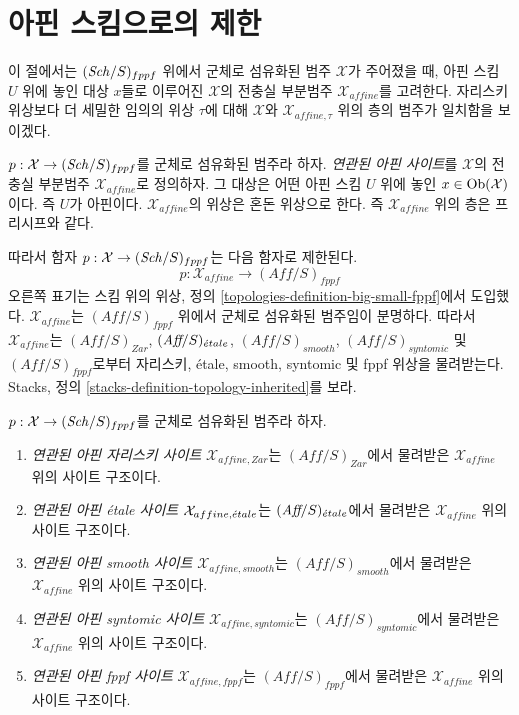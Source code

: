 \section{아핀 스킴으로의 제한}
\label{section-alternative}

\noindent
이 절에서는 $(\mathit{Sch}/S)_{fppf}$ 위에서 군체로 섬유화된 범주
$\mathcal{X}$가 주어졌을 때, 아핀 스킴 $U$ 위에 놓인 대상 $x$들로
이루어진 $\mathcal{X}$의 전충실 부분범주 $\mathcal{X}_{affine}$를
고려한다. 자리스키 위상보다 더 세밀한 임의의 위상 $\tau$에 대해
$\mathcal{X}$와 $\mathcal{X}_{affine, \tau}$ 위의 층의 범주가
일치함을 보이겠다.

\begin{definition}
\label{definition-alternative}
$p : \mathcal{X} \to (\mathit{Sch}/S)_{fppf}$를 군체로 섬유화된 범주라 하자.
{\it 연관된 아핀 사이트}를 $\mathcal{X}$의 전충실 부분범주
$\mathcal{X}_{affine}$로 정의하자. 그 대상은 어떤 아핀 스킴 $U$ 위에
놓인 $x \in \mathop{\mathrm{Ob}}\nolimits(\mathcal{X})$이다. 즉 $U$가 아핀이다.
$\mathcal{X}_{affine}$의 위상은
혼돈 위상으로 한다. 즉 $\mathcal{X}_{affine}$ 위의 층은 프리시프와 같다.
\end{definition}

\noindent
따라서 함자 $p : \mathcal{X} \to (\mathit{Sch}/S)_{fppf}$는 다음 함자로 제한된다.
$$
p : \mathcal{X}_{affine} \longrightarrow (\textit{Aff}/S)_{fppf}
$$
오른쪽 표기는 스킴 위의 위상, 정의 \ref{topologies-definition-big-small-fppf}에서
도입했다. $\mathcal{X}_{affine}$는 $(\textit{Aff}/S)_{fppf}$ 위에서
군체로 섬유화된 범주임이 분명하다. 따라서 $\mathcal{X}_{affine}$는
$(\textit{Aff}/S)_{Zar}$, $(\textit{Aff}/S)_{\acute{e}tale}$,
$(\textit{Aff}/S)_{smooth}$, $(\textit{Aff}/S)_{syntomic}$ 및
$(\textit{Aff}/S)_{fppf}$로부터 자리스키, \'etale, smooth, syntomic 및
fppf 위상을 물려받는다. Stacks, 정의
\ref{stacks-definition-topology-inherited}를 보라.

\begin{definition}
\label{definition-alternative-inherited-topologies}
 $p : \mathcal{X} \to (\mathit{Sch}/S)_{fppf}$를 군체로 섬유화된 범주라 하자.
\begin{enumerate}
\item {\it 연관된 아핀 자리스키 사이트} $\mathcal{X}_{affine, Zar}$는
$(\textit{Aff}/S)_{Zar}$에서 물려받은 $\mathcal{X}_{affine}$ 위의
사이트 구조이다.
\item {\it 연관된 아핀 \'etale 사이트} $\mathcal{X}_{affine, {\acute{e}tale}}$는
$(\textit{Aff}/S)_{\acute{e}tale}$에서 물려받은 $\mathcal{X}_{affine}$ 위의 사이트 구조이다.
\item {\it 연관된 아핀 smooth 사이트} $\mathcal{X}_{affine, smooth}$는
$(\textit{Aff}/S)_{smooth}$에서 물려받은 $\mathcal{X}_{affine}$ 위의 사이트 구조이다.
\item {\it 연관된 아핀 syntomic 사이트} $\mathcal{X}_{affine, syntomic}$는
$(\textit{Aff}/S)_{syntomic}$에서 물려받은 $\mathcal{X}_{affine}$ 위의 사이트 구조이다.
\item {\it 연관된 아핀 fppf 사이트} $\mathcal{X}_{affine, fppf}$는
$(\textit{Aff}/S)_{fppf}$에서 물려받은 $\mathcal{X}_{affine}$ 위의 사이트 구조이다.
\end{enumerate}
\end{definition}

